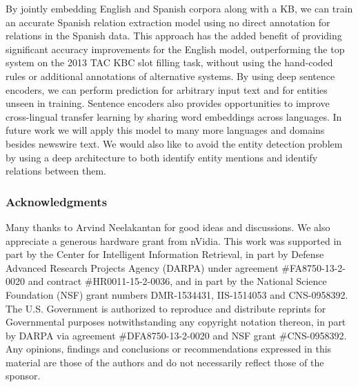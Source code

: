 \documentclass{article} %
\begin{document}
By jointly embedding English and Spanish corpora along with a KB, we can train an accurate Spanish relation extraction model using no direct annotation for relations in the Spanish data. This approach has the added benefit of providing significant accuracy improvements for the English model, outperforming the top system on the 2013 TAC KBC slot filling task, without using the hand-coded rules or additional annotations of alternative systems. By using deep sentence encoders, we can perform prediction for arbitrary input text and for entities unseen in training. Sentence encoders also provides opportunities to improve cross-lingual transfer learning by sharing word embeddings across languages. In future work we will apply this model to many more languages and domains besides newswire text. We would also like to avoid the entity detection problem by using a deep architecture to both identify entity mentions and identify relations between them.

\subsubsection*{Acknowledgments}
Many thanks to Arvind Neelakantan for good ideas and discussions. We also appreciate a generous hardware grant from nVidia. This work was supported in part by the Center for Intelligent Information Retrieval, in part by Defense Advanced Research Projects Agency (DARPA) under agreement \#FA8750-13-2-0020 and contract \#HR0011-15-2-0036, and in part by the National Science Foundation (NSF) grant numbers DMR-1534431, IIS-1514053 and CNS-0958392. The U.S. Government is authorized to reproduce and distribute reprints for Governmental purposes notwithstanding any copyright notation thereon, in part by DARPA via agreement \#DFA8750-13-2-0020 and NSF grant \#CNS-0958392. Any opinions, findings and conclusions or recommendations expressed in this material are those of the authors and do not necessarily reflect those of the sponsor.




\newpage

\end{document}
